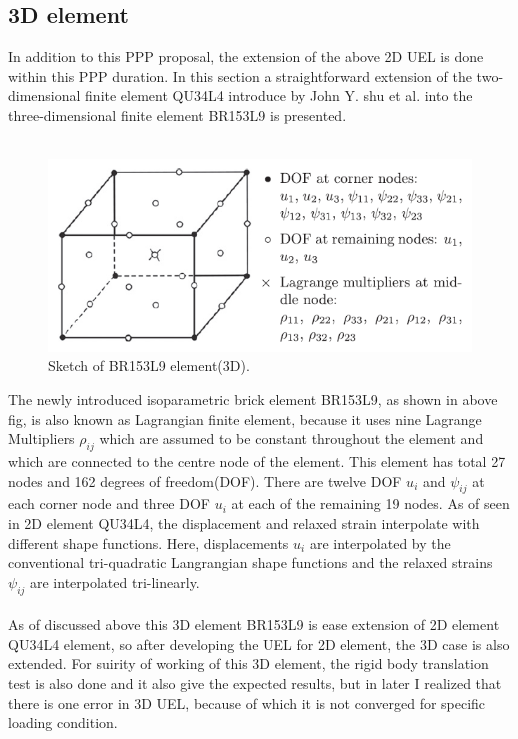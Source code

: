\documentclass[12pt]{article}
\begin{document}
\subsection{3D element}
In addition to this PPP proposal, the extension of the above 2D UEL is done within this PPP duration. In this section a straightforward extension of the two-dimensional finite element QU34L4 introduce by John Y. shu et al. into the three-dimensional finite element BR153L9 is presented. 
\\
\\
\begin{figure}[H]
	\begin{center}
		\includegraphics[scale=1.2]{3d_element.png}  
	\end{center}  
	\caption{Sketch of BR153L9 element(3D). \cite{zybell2012three}}
\end{figure}
The newly introduced isoparametric brick element BR153L9, as shown in above fig, is also known as Lagrangian finite element, because it uses nine Lagrange Multipliers $\rho_{ij}$ which are assumed to be constant throughout the element and which are connected to the centre node of the element. This element has total 27 nodes and 162 degrees of freedom(DOF). There are twelve DOF $u_i$ and $\psi_{ij}$ at each corner node and three DOF $u_i$ at each of the remaining 19 nodes. As of seen in 2D element QU34L4, the displacement and relaxed strain interpolate with different shape functions. Here, displacements $u_i$ are interpolated by the conventional tri-quadratic Langrangian shape functions and the relaxed strains $\psi_{ij}$ are interpolated tri-linearly.	\\
\\
As of discussed above this 3D element BR153L9 is ease extension of 2D element QU34L4 element, so after developing the UEL for 2D element, the 3D case is also extended. For suirity of working of this 3D element, the rigid body translation test is also done and it also give the expected results, but in later I realized that there is one error in 3D UEL, because of which it is not converged for specific loading condition.
\end{document}
